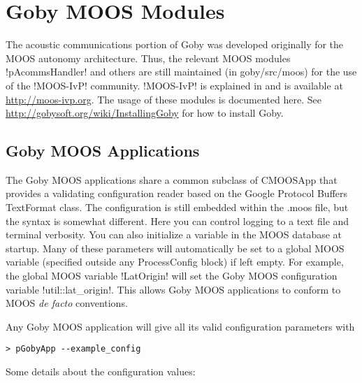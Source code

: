 \chapter{Goby MOOS Modules}\label{chap:MOOS}
\MakeShortVerb{\!} %

The acoustic communications portion of Goby was developed originally for the MOOS autonomy architecture. Thus, the relevant MOOS modules !pAcommsHandler! and others are still maintained (in goby/src/moos) for the use of the !MOOS-IvP! community. !MOOS-IvP! is explained in \cite{moos-ivp-jfr} and is available at \url{http://moos-ivp.org}. The usage of these modules is documented here. See \url{http://gobysoft.org/wiki/InstallingGoby} for how to install Goby.


\section{Goby MOOS Applications} \label{sec:goby_moos_app}

The Goby MOOS applications share a common subclass of CMOOSApp that provides a validating configuration reader based on the Google Protocol Buffers TextFormat class. The configuration is still embedded within the .moos file, but the syntax is somewhat different. Here you can control logging to a text file and terminal verbosity. You can also initialize a variable in the MOOS database at startup. Many of these parameters will automatically be set to a global MOOS variable (specified outside any ProcessConfig block) if left empty. For example, the global MOOS variable !LatOrigin! will set the Goby MOOS configuration variable !util::lat_origin!. This allows Goby MOOS applications to conform to MOOS \textit{de facto} conventions.

Any Goby MOOS application will give all its valid configuration parameters with \begin{verbatim}
> pGobyApp --example_config
\end{verbatim} 

\resetbvlinenumber

Some details about the configuration values:

